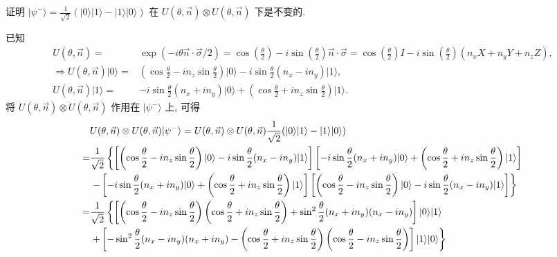 \documentclass{assignment}
\begin{document}
\begin{probcontinued}{9}
    证明 $\lvert\psi^-\rangle=\frac{1}{\sqrt{2}}(\lvert 0\rangle\lvert 1\rangle-\lvert 1\rangle\lvert 0\rangle)$ 在 $U(\theta,\vec{n})\otimes U(\theta,\vec{n})$ 下是不变的.
\end{probcontinued}
\begin{pf}
    已知
    \begin{align}
        U(\theta,\vec{n})=&\exp(-i\theta\vec{n}\cdot\vec{\sigma}/2)=\cos\left(\frac{\theta}{2}\right)-i\sin\left(\frac{\theta}{2}\right)\vec{n}\cdot\vec{\sigma}=\cos\left(\frac{\theta}{2}\right)I-i\sin\left(\frac{\theta}{2}\right)(n_xX+n_yY+n_zZ),\\
        \Longrightarrow U(\theta,\vec{n})\lvert 0\rangle=&\left(\cos\frac{\theta}{2}-in_z\sin\frac{\theta}{2}\right)\lvert 0\rangle-i\sin\frac{\theta}{2}\left(n_x-in_y\right)\lvert 1\rangle,\\
        U(\theta,\vec{n})\lvert 1\rangle=&-i\sin\frac{\theta}{2}(n_x+in_y)\lvert 0\rangle+\left(\cos\frac{\theta}{2}+in_z\sin\frac{\theta}{2}\right)\lvert 1\rangle.
    \end{align}
    将 $U(\theta,\vec{n})\otimes U(\theta,\vec{n})$ 作用在 $\lvert\psi^-\rangle$ 上, 可得
    \begin{align}
        \notag&U(\theta,\vec{n})\otimes U(\theta,\vec{n})\lvert\psi^-\rangle=U(\theta,\vec{n})\otimes U(\theta,\vec{n})\frac{1}{\sqrt{2}}(\lvert 0\rangle\lvert 1\rangle-\lvert 1\rangle\lvert 0\rangle)\\
        \notag=&\frac{1}{\sqrt{2}}\left\{\left[\left(\cos\frac{\theta}{2}-in_z\sin\frac{\theta}{2}\right)\lvert 0\rangle-i\sin\frac{\theta}{2}(n_x-in_y)\lvert 1\rangle\right]\left[-i\sin\frac{\theta}{2}(n_x+in_y)\lvert 0\rangle+\left(\cos\frac{\theta}{2}+in_z\sin\frac{\theta}{2}\right)\lvert 1\rangle\right]\right.\\
        \notag&\left.-\left[-i\sin\frac{\theta}{2}(n_x+in_y)\lvert 0\rangle+\left(\cos\frac{\theta}{2}+in_z\sin\frac{\theta}{2}\right)\lvert 1\rangle\right]\left[\left(\cos\frac{\theta}{2}-in_z\sin\frac{\theta}{2}\right)\lvert 0\rangle-i\sin\frac{\theta}{2}(n_x-in_y)\lvert 1\rangle\right]\right\}\\
        \notag=&\frac{1}{\sqrt{2}}\left\{\left[\left(\cos\frac{\theta}{2}-in_z\sin\frac{\theta}{2}\right)\left(\cos\frac{\theta}{2}+in_z\sin\frac{\theta}{2}\right)+\sin^2\frac{\theta}{2}(n_x+in_y)(n_x-in_y)\right]\lvert 0\rangle\lvert 1\rangle\right.\\
        \notag&\left.+\left[-\sin^2\frac{\theta}{2}(n_x-in_y)(n_x+in_y)-\left(\cos\frac{\theta}{2}+in_z\sin\frac{\theta}{2}\right)\left(\cos\frac{\theta}{2}-in_z\sin\frac{\theta}{2}\right)\right]\lvert 1\rangle\lvert 0\rangle\right\}\\

\end{align}
\end{pf}
\end{document}
